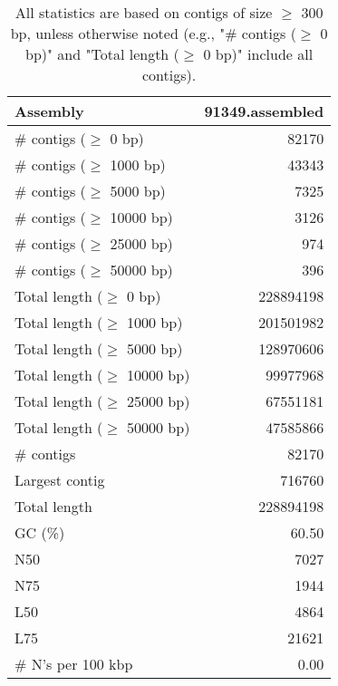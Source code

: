 \documentclass[12pt,a4paper]{article}
\begin{document}
\begin{table}[ht]
\begin{center}
\caption{All statistics are based on contigs of size $\geq$ 300 bp, unless otherwise noted (e.g., "\# contigs ($\geq$ 0 bp)" and "Total length ($\geq$ 0 bp)" include all contigs).}
\begin{tabular}{|l*{1}{|r}|}
\hline
Assembly & 91349.assembled \\ \hline
\# contigs ($\geq$ 0 bp) & 82170 \\ \hline
\# contigs ($\geq$ 1000 bp) & 43343 \\ \hline
\# contigs ($\geq$ 5000 bp) & 7325 \\ \hline
\# contigs ($\geq$ 10000 bp) & 3126 \\ \hline
\# contigs ($\geq$ 25000 bp) & 974 \\ \hline
\# contigs ($\geq$ 50000 bp) & 396 \\ \hline
Total length ($\geq$ 0 bp) & 228894198 \\ \hline
Total length ($\geq$ 1000 bp) & 201501982 \\ \hline
Total length ($\geq$ 5000 bp) & 128970606 \\ \hline
Total length ($\geq$ 10000 bp) & 99977968 \\ \hline
Total length ($\geq$ 25000 bp) & 67551181 \\ \hline
Total length ($\geq$ 50000 bp) & 47585866 \\ \hline
\# contigs & 82170 \\ \hline
Largest contig & 716760 \\ \hline
Total length & 228894198 \\ \hline
GC (\%) & 60.50 \\ \hline
N50 & 7027 \\ \hline
N75 & 1944 \\ \hline
L50 & 4864 \\ \hline
L75 & 21621 \\ \hline
\# N's per 100 kbp & 0.00 \\ \hline
\end{tabular}
\end{center}
\end{table}
\end{document}
